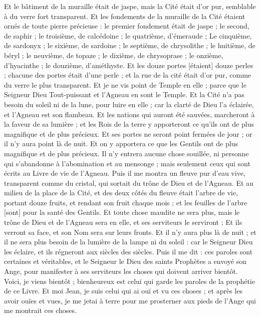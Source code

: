\begin{multicols}{2}
Et le bâtiment de la muraille était de jaspe, mais la Cité était d'or pur, semblable à du verre fort transparent.
Et les fondements de la muraille de la Cité étaient ornés de toute pierre précieuse : le premier fondement était de jaspe ; le second, de saphir ; le troisième, de calcédoine ; le quatrième, d'émeraude ;
Le cinquième, de sardonyx ; le sixième, de sardoine ; le septième, de chrysolithe ; le huitième, de béryl ; le neuvième, de topaze ; le dixième, de chrysoprase ; le onzième, d'hyacinthe ; le douzième, d'améthyste.
Et les douze portes [étaient] douze perles ; chacune des portes était d'une perle ; et la rue de la cité était d'or pur, comme du verre le plus transparent.
Et je ne vis point de Temple en elle ; parce que le Seigneur Dieu Tout-puissant et l'Agneau en sont le Temple.
Et la Cité n'a pas besoin du soleil ni de la lune, pour luire en elle ; car la clarté de Dieu l'a éclairée, et l'Agneau est son flambeau.
Et les nations qui auront été sauvées, marcheront à la faveur de sa lumière ; et les Rois de la terre y apporteront ce qu'ils ont de plus magnifique et de plus précieux.
Et ses portes ne seront point fermées de jour ; or il n'y aura point là de nuit.
Et on y apportera ce que les Gentils ont de plus magnifique et de plus précieux.
Il n'y entrera aucune chose souillée, ni personne qui s'abandonne à l'abomination et au mensonge ; mais seulement ceux qui sont écrits au Livre de vie de l'Agneau.
\VerseOne{}Puis il me montra un fleuve pur d'eau vive, transparent comme du cristal, qui sortait du trône de Dieu et de l'Agneau.
Et au milieu de la place de la Cité, et des deux côtés du fleuve était l'arbre de vie, portant douze fruits, et rendant son fruit chaque mois ; et les feuilles de l'arbre [sont] pour la santé des Gentils.
Et toute chose maudite ne sera plus, mais le trône de Dieu et de l'Agneau sera en elle, et ses serviteurs le serviront ;
Et ils verront sa face, et son Nom sera sur leurs fronts.
Et il n'y aura plus là de nuit ; et il ne sera plus besoin de la lumière de la lampe ni du soleil : car le Seigneur Dieu les éclaire, et ils régneront aux siècles des siècles.
Puis il me dit : ces paroles sont certaines et véritables, et le Seigneur le Dieu des saints Prophètes a envoyé son Ange, pour manifester à ses serviteurs les choses qui doivent arriver bientôt.
Voici, je viens bientôt ; bienheureux est celui qui garde les paroles de la prophétie de ce Livre.
Et moi Jean, je suis celui qui ai ouï et vu ces choses ; et après les avoir ouïes et vues, je me jetai à terre pour me prosterner aux pieds de l'Ange qui me montrait ces choses.

\end{multicols}
